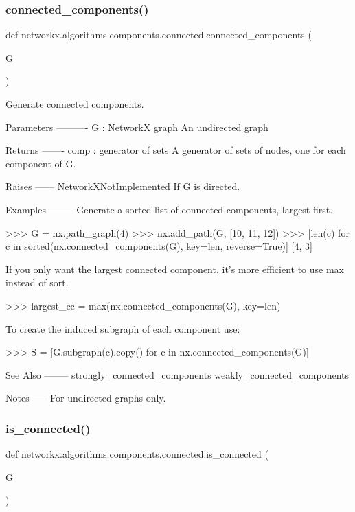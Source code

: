 \subsubsection{\texorpdfstring{connected\+\_\+components()}{connected\_components()}}
{\footnotesize\ttfamily def networkx.\+algorithms.\+components.\+connected.\+connected\+\_\+components (\begin{DoxyParamCaption}\item[{}]{G }\end{DoxyParamCaption})}

\begin{DoxyVerb}Generate connected components.

Parameters
----------
G : NetworkX graph
   An undirected graph

Returns
-------
comp : generator of sets
   A generator of sets of nodes, one for each component of G.

Raises
------
NetworkXNotImplemented
    If G is directed.

Examples
--------
Generate a sorted list of connected components, largest first.

>>> G = nx.path_graph(4)
>>> nx.add_path(G, [10, 11, 12])
>>> [len(c) for c in sorted(nx.connected_components(G), key=len, reverse=True)]
[4, 3]

If you only want the largest connected component, it's more
efficient to use max instead of sort.

>>> largest_cc = max(nx.connected_components(G), key=len)

To create the induced subgraph of each component use:

>>> S = [G.subgraph(c).copy() for c in nx.connected_components(G)]

See Also
--------
strongly_connected_components
weakly_connected_components

Notes
-----
For undirected graphs only.\end{DoxyVerb}
 \mbox{\label{namespacenetworkx_1_1algorithms_1_1components_1_1connected_a9d97441f041c2b3cdd180c70c5f9b3b5}} 
\subsubsection{\texorpdfstring{is\+\_\+connected()}{is\_connected()}}
{\footnotesize\ttfamily def networkx.\+algorithms.\+components.\+connected.\+is\+\_\+connected (\begin{DoxyParamCaption}\item[{}]{G }\end{DoxyParamCaption})}

